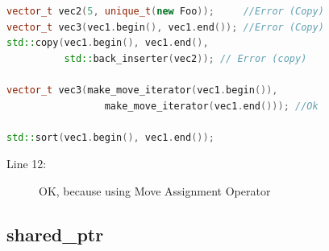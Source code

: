 \documentclass[a4paper,11pt,twoside]{book}
\begin{document}
\begin{itemize}
\begin{lstlisting}[frame=single, language=c++]
vector_t vec2(5, unique_t(new Foo));     //Error (Copy)
vector_t vec3(vec1.begin(), vec1.end()); //Error (Copy)
std::copy(vec1.begin(), vec1.end(),
          std::back_inserter(vec2)); // Error (copy)

vector_t vec3(make_move_iterator(vec1.begin()),
                 make_move_iterator(vec1.end())); //Ok

std::sort(vec1.begin(), vec1.end());
\end{lstlisting}
\begin{description}
	\item[Line 12:] OK, because using Move Assignment Operator
\end{description}

\end{itemize}


\subsection{shared\_ptr}
\end{document}
